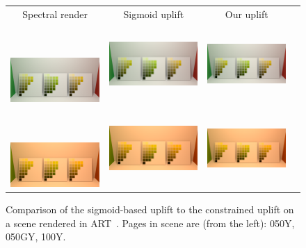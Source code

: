 \begin{figure}[ht]
	\centering
	{\sffamily
		\begin{tabular}{cccc}
			Spectral render & Sigmoid uplift & Our uplift
			\vspace{1em} \\
			\raisebox{0.5cm}[0pt][0pt]{\parbox[c][0pt][c]{0cm}{\hspace{-1.5em}\\[10pt]}\par}
			\includegraphics[width=.29\linewidth]{img/results_art_original_d65.png}
			&
			\includegraphics[width=.29\linewidth]{img/results_art_sigmoids_d65.png}
			& 
			\includegraphics[width=.29\linewidth]{img/results_art_constrained_d65.png}
			\vspace{1em} \\
			\raisebox{0.5cm}[0pt][0pt]{\parbox[c][0pt][c]{0cm}{\hspace{-1.5em}\\[10pt]}\par}
			\includegraphics[width=.29\linewidth]{img/results_art_original_fl12.png}
			&
			\includegraphics[width=.29\linewidth]{img/results_art_sigmoids_fl12.png}
			&
			\includegraphics[width=.29\linewidth]{img/results_art_constrained_fl12.png}
		\end{tabular}
	}
	\caption{Comparison of the sigmoid-based uplift to the constrained uplift on a scene rendered in ART~\cite{ART}. Pages in scene are (from the left): 050Y, 050GY, 100Y.}
	\label{fig:results_art_scene}
\end{figure}

